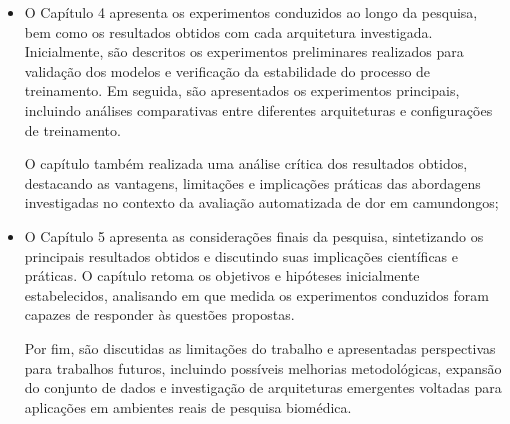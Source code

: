 \begin{itemize}
	\item O Capítulo 4 apresenta os experimentos conduzidos ao longo da pesquisa, bem como os resultados obtidos com cada arquitetura investigada. Inicialmente, são descritos os experimentos preliminares realizados para validação dos modelos e verificação da estabilidade do processo de treinamento. Em seguida, são apresentados os experimentos principais, incluindo análises comparativas entre diferentes arquiteturas e configurações de treinamento.
	
	O capítulo também  realizada uma análise crítica dos resultados obtidos, destacando as vantagens, limitações e implicações práticas das abordagens investigadas no contexto da avaliação automatizada de dor em camundongos;
	
	\item O Capítulo 5 apresenta as considerações finais da pesquisa, sintetizando os principais resultados obtidos e discutindo suas implicações científicas e práticas. O capítulo retoma os objetivos e hipóteses inicialmente estabelecidos, analisando em que medida os experimentos conduzidos foram capazes de responder às questões propostas. 
	
	Por fim, são discutidas as limitações do trabalho e apresentadas perspectivas para trabalhos futuros, incluindo possíveis melhorias metodológicas, expansão do conjunto de dados e investigação de arquiteturas emergentes voltadas para aplicações em ambientes reais de pesquisa biomédica.
	
\end{itemize}
